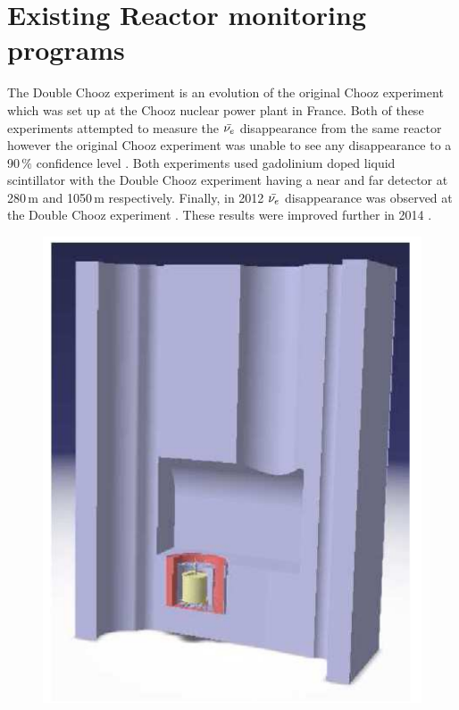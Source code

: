 \section{Existing Reactor monitoring programs}\label{sec:exisitingReactorMonitoringPrograms}
The Double Chooz experiment is an evolution of the original Chooz experiment which was set up at the Chooz nuclear power plant in France\cite{lasserre2006}. Both of these experiments attempted to measure the $\Bar{\nu_e}$ disappearance from the same reactor however the original Chooz experiment was unable to see any disappearance to a 90$\,\%$ confidence level \cite{Apollonio_2003}. Both experiments used gadolinium doped liquid scintillator with the Double Chooz experiment having a near and far detector at 280\,m and 1050\,m respectively\cite{lasserre2006}. Finally, in 2012 $\Bar{\nu_e}$ disappearance was observed at the Double Chooz experiment \cite{Abe_2012}. These results were improved further in 2014 \cite{abe2014improved}.
\begin{figure}[!h]
 \centering
 \includegraphics[width=0.25\linewidth]{Chapter2/Figs/Raster/DCNearDetector.png} %
 \label{DoubleChoozNearDetector}
\end{figure}
